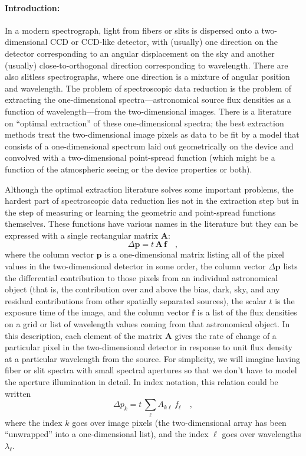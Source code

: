 \documentclass[12pt]{article}
\newcommand{\hmatrix}[1]{\boldsymbol{#1}}
\newcommand{\Amatrix}{\hmatrix{A}}
\newcommand{\pixels}{\hmatrix{p}}
\newcommand{\flux}{\hmatrix{f}}
\newcommand{\exptime}{t}
\begin{document}
\paragraph{Introduction:}
In a modern spectrograph, light from fibers or slits is dispersed onto
a two-dimensional CCD or CCD-like detector, with (usually) one
direction on the detector corresponding to an angular displacement on
the sky and another (usually) close-to-orthogonal direction
corresponding to wavelength.  There are also slitless spectrographs,
where one direction is a mixture of angular position and wavelength.
The problem of spectroscopic data reduction is the problem of
extracting the one-dimensional spectra---astronomical source flux
densities as a function of wavelength---from the two-dimensional
images.  There is a literature on ``optimal extraction'' of these
one-dimensional spectra; the best extraction methods treat the
two-dimensional image pixels as data to be fit by a model that
consists of a one-dimensional spectrum laid out geometrically on the
device and convolved with a two-dimensional point-spread function
(which might be a function of the atmospheric seeing or the device
properties or both).

Although the optimal extraction literature solves some important
problems, the hardest part of spectroscopic data reduction lies not in
the extraction step but in the step of measuring or learning the
geometric and point-spread functions themselves.  These functions have
various names in the literature but they can be expressed with a
single rectangular matrix $\Amatrix$:
\begin{equation}
\Delta\pixels = \exptime\,\Amatrix\,\flux \quad ,
\end{equation}
where the column vector $\pixels$ is a one-dimensional matrix listing
all of the pixel values in the two-dimensional detector in some order,
the column vector $\Delta\pixels$ lists the differential contribution
to those pixels from an individual astronomical object (that is, the
contribution over and above the bias, dark, sky, and any residual
contributions from other spatially separated sources), the scalar
$\exptime$ is the exposure time of the image, and the column vector
$\flux$ is a list of the flux densities on a grid or list of
wavelength values coming from that astronomical object.  In this
description, each element of the matrix $\Amatrix$ gives the rate of
change of a particular pixel in the two-dimensional detector in
response to unit flux density at a particular wavelength from the
source.  For simplicity, we will imagine having fiber or slit spectra
with small spectral apertures so that we don't have to model the
aperture illumination in detail.  In index notation, this relation
could be written
\begin{equation}
\Delta p_k = \exptime\,\sum_{\ell} A_{k\ell}\,f_{\ell} \quad ,
\end{equation}
where the index $k$ goes over image pixels (the two-dimensional array
has been ``unwrapped'' into a one-dimensional list), and the index
$\ell$ goes over wavelengths $\lambda_{\ell}$.
\end{document}

